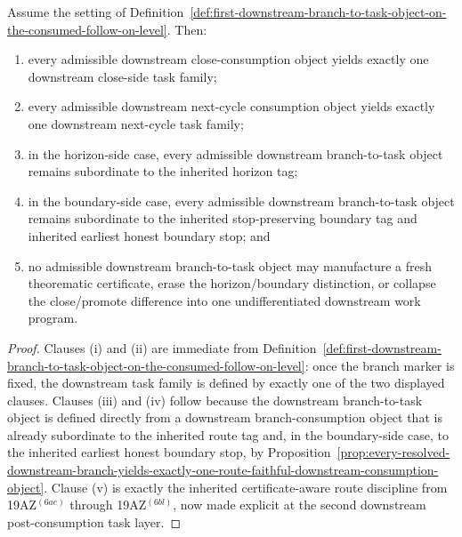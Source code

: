 \begin{proposition}
\label{prop:every-consumed-downstream-branch-yields-exactly-one-route-faithful-downstream-task-family}
Assume the setting of Definition~\ref{def:first-downstream-branch-to-task-object-on-the-consumed-follow-on-level}. Then:
\begin{enumerate}[label=(\roman*)]
 \item every admissible downstream close-consumption object yields exactly one downstream close-side task family;
 \item every admissible downstream next-cycle consumption object yields exactly one downstream next-cycle task family;
 \item in the horizon-side case, every admissible downstream branch-to-task object remains subordinate to the inherited horizon tag;
 \item in the boundary-side case, every admissible downstream branch-to-task object remains subordinate to the inherited stop-preserving boundary tag and inherited earliest honest boundary stop; and
 \item no admissible downstream branch-to-task object may manufacture a fresh theorematic certificate, erase the horizon/boundary distinction, or collapse the close/promote difference into one undifferentiated downstream work program.
\end{enumerate}
\end{proposition}

\begin{proof}
Clauses (i) and (ii) are immediate from Definition~\ref{def:first-downstream-branch-to-task-object-on-the-consumed-follow-on-level}: once the branch marker is fixed, the downstream task family is defined by exactly one of the two displayed clauses. Clauses (iii) and (iv) follow because the downstream branch-to-task object is defined directly from a downstream branch-consumption object that is already subordinate to the inherited route tag and, in the boundary-side case, to the inherited earliest honest boundary stop, by Proposition~\ref{prop:every-resolved-downstream-branch-yields-exactly-one-route-faithful-downstream-consumption-object}. Clause (v) is exactly the inherited certificate-aware route discipline from 19AZ$^{(6ae)}$ through 19AZ$^{(6bl)}$, now made explicit at the second downstream post-consumption task layer.
\end{proof}

